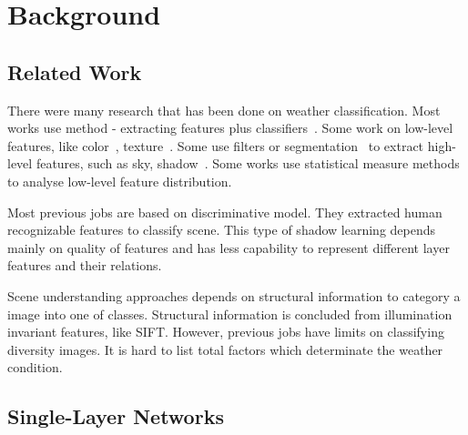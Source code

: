 
\chapter{Background} %
\label{Chapter2}

\section{Related Work}

There were many research that has been done on weather classification. Most works use method - extracting features plus classifiers~\citep{bishop1995neural,roser2008classification,serrano2002computationally,gokalp2007scene}.
Some work on low-level features, like color~\citep{szummer1998indoor}, texture~\citep{shotton2009textonboost,vailaya2002automatic}. Some use filters or segmentation~\citep{boutell2004learning,shotton2009textonboost} to extract high-level features, such as sky, shadow~\citep{lutwo}. Some works use statistical measure methods~\citep{he2014spatial,roser2008classification} to analyse low-level feature distribution.

Most previous jobs are based on discriminative model. They extracted human recognizable features to classify scene. This type of shadow learning depends mainly on quality of features and has less capability to represent different layer features and their relations.

Scene understanding approaches depends on structural information to category a image into one of classes. Structural information is concluded from illumination invariant features, like SIFT. However, previous jobs have limits on classifying diversity images. It is hard to list total factors which determinate the weather condition. 
\section{Single-Layer Networks}

